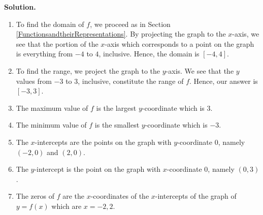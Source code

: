 \documentclass{ximera}
\begin{document}
\begin{example}
\begin{center}
% 


\end{center}


{\bf Solution.} 

\begin{enumerate}

\item  To find the domain of $f$, we proceed as in Section \ref{FunctionsandtheirRepresentations}.  By projecting the graph to the $x$-axis, we see that the portion of the $x$-axis which corresponds to a point on the graph is everything from $-4$ to $4$, inclusive.  Hence, the domain is $[-4,4]$.

\item  To find the range, we project the graph to the $y$-axis.  We see that the $y$ values from $-3$ to $3$, inclusive, constitute the range of $f$.  Hence, our answer is $[-3,3]$.

\item  The maximum value of $f$ is the largest $y$-coordinate which is $3$.

\item  The minimum value of $f$ is the smallest $y$-coordinate which is $-3$.

\item  The $x$-intercepts are the points on the graph with $y$-coordinate $0$, namely $(-2,0)$ and $(2,0)$.

\item  The $y$-intercept is the point on the graph with $x$-coordinate $0$, namely $(0,3)$.

\item  The zeros of $f$ are the $x$-coordinates of the $x$-intercepts of the graph of $y=f(x)$ which are $x=-2, 2$.


\end{enumerate}
\end{example}
\end{document}
